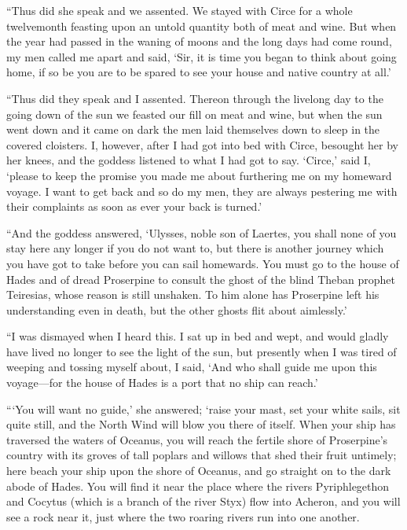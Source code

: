 “Thus did she speak and we assented. We stayed with Circe for a whole
twelvemonth feasting upon an untold quantity both of meat and wine. But when
the year had passed in the waning of moons and the long days had come round, my
men called me apart and said, ‘Sir, it is time you began to think about going
home, if so be you are to be spared to see your house and native country at
all.’

“Thus did they speak and I assented. Thereon through the livelong day to the
going down of the sun we feasted our fill on meat and wine, but when the sun
went down and it came on dark the men laid themselves down to sleep in the
covered cloisters. I, however, after I had got into bed with Circe, besought
her by her knees, and the goddess listened to what I had got to say. ‘Circe,’
said I, ‘please to keep the promise you made me about furthering me on my
homeward voyage. I want to get back and so do my men, they are always pestering
me with their complaints as soon as ever your back is turned.’

“And the goddess answered, ‘Ulysses, noble son of Laertes, you shall none of
you stay here any longer if you do not want to, but there is another journey
which you have got to take before you can sail homewards. You must go to the
house of Hades and of dread Proserpine to consult the ghost of the blind Theban
prophet Teiresias, whose reason is still unshaken. To him alone has Proserpine
left his understanding even in death, but the other ghosts flit about
aimlessly.’

“I was dismayed when I heard this. I sat up in bed and wept, and would gladly
have lived no longer to see the light of the sun, but presently when I was
tired of weeping and tossing myself about, I said, ‘And who shall guide me upon
this voyage—for the house of Hades is a port that no ship can reach.’

“‘You will want no guide,’ she answered; ‘raise your mast, set your white
sails, sit quite still, and the North Wind will blow you there of itself. When
your ship has traversed the waters of Oceanus, you will reach the fertile shore
of Proserpine’s country with its groves of tall poplars and willows that shed
their fruit untimely; here beach your ship upon the shore of Oceanus, and go
straight on to the dark abode of Hades. You will find it near the place where
the rivers Pyriphlegethon and Cocytus (which is a branch of the river Styx)
flow into Acheron, and you will see a rock near it, just where the two roaring
rivers run into one another.


